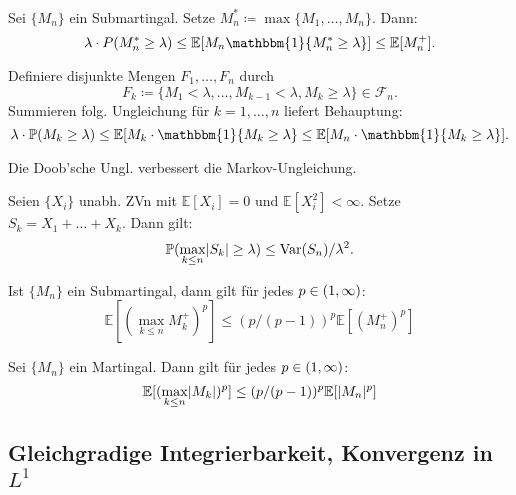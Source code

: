 \documentclass{cheat-sheet}
\renewcommand{\P}{\mathbb{P}} %
\newcommand{\E}{\mathbb{E}} %
\newcommand{\ind}{\mathbbm{1}} %
\DeclareMathOperator{\var}{Var} %
\begin{document}
\begin{satz} \mbox{}\\
  Sei $\{ M_n \}$ ein Submartingal.
  Setze $M_n^* \coloneqq \max \{ M_1, \ldots, M_n \}$.
  Dann:
  \[
    \lambda \cdot P(M_n^* \geq \lambda) \leq \E[ M_n \ind \{ M_n^* \geq \lambda \}] \leq \E[ M_n^{+} ].
  \]
\end{satz}

\begin{beweis}
  Definiere disjunkte Mengen $F_1, \ldots, F_n$ durch
  \[
    F_k \coloneqq \{ M_1 < \lambda, \ldots, M_{k-1} < \lambda, M_k \geq \lambda \} \in \mathcal{F}_n.
  \]
  Summieren folg. Ungleichung für $k = 1, \ldots, n$ liefert Behauptung:
  \[
    \lambda \cdot \P(M_k \geq \lambda) \leq \E[ M_k \cdot \ind \{ M_k \geq \lambda \} \leq \E[ M_n \cdot \ind \{ M_k \geq \lambda \} ].
  \]
\end{beweis}

\begin{bem}
  Die Doob'sche Ungl. verbessert die Markov-Ungleichung.
\end{bem}

\begin{kor}
  Seien $\{ X_i \}$ unabh. ZVn mit $\E[ X_i ] = 0$ und $\E[ X_i^2 ] < \infty$.
  Setze $S_k = X_1 + \ldots + X_k$.
  Dann gilt:
  \[ \P(\max_{k \leq n} \abs{S_k} \geq \lambda) \leq \var(S_n) / \lambda^2. \]
\end{kor}

\begin{satz}
  Ist $\{ M_n \}$ ein Submartingal, dann gilt für jedes $p \in \left( 1, \infty \right)$:
  \[
    \E[ (\max_{k \leq n} M_k^+)^p ] \leq (p / (p-1))^p \E[ (M_n^{+})^p ]
  \]
\end{satz}

\begin{kor}
  Sei $\{ M_n \}$ ein Martingal.
  Dann gilt für jedes $p \in \left( 1, \infty \right)$:
  \[
    \E[ (\max_{k \leq n} \abs{M_k})^p ] \leq (p / (p-1))^p \E[ \abs{M_n}^p ]
  \]
\end{kor}

\subsection{Gleichgradige Integrierbarkeit, Konvergenz in $L^1$}

\end{document}
